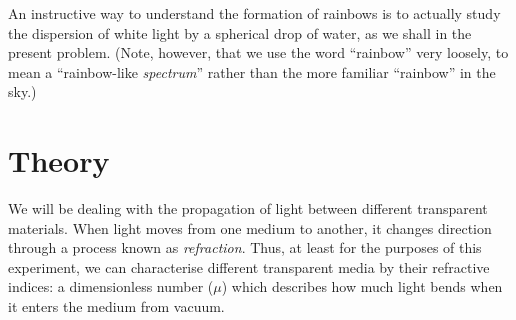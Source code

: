 \begin{refsection}
An instructive way to understand the formation of rainbows is to actually study the dispersion of white light by a spherical drop of water, as we shall in the present problem. (Note, however, that we use the word ``rainbow'' very loosely, to mean a ``rainbow-like \textit{spectrum}'' rather than the more familiar ``rainbow'' in the sky.) 


\section*{Theory}

We will be dealing with the propagation of light between different transparent materials. When light moves from one medium to another, it changes direction through a process known as \textit{refraction}. Thus, at least for the purposes of this experiment, we can characterise different transparent media by their refractive indices: a dimensionless number ($\mu$) which describes how much light bends when it enters the medium from vacuum. 


\end{refsection}
